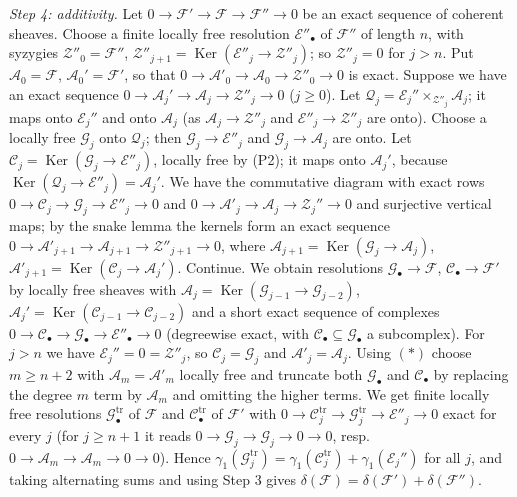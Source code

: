 \documentclass[11pt]{article}
\begin{document}
\emph{Step 4: additivity.} Let $0\to\mathcal F'\to\mathcal F\to\mathcal F''\to0$ be an exact sequence of coherent sheaves. Choose a finite locally free resolution $\mathcal E''_\bullet$ of $\mathcal F''$ of length $n$, with syzygies $\mathcal Z''_0=\mathcal F''$, $\mathcal Z''_{j+1}=\operatorname{Ker}(\mathcal E''_j\to\mathcal Z''_j)$; so $\mathcal Z''_{j}=0$ for $j>n$. Put $\mathcal A_0=\mathcal F$, $\mathcal A_0'=\mathcal F'$, so that $0\to\mathcal A'_0\to\mathcal A_0\to\mathcal Z''_0\to0$ is exact. Suppose we have an exact sequence $0\to\mathcal A_j'\to\mathcal A_j\to\mathcal Z''_j\to0$ ($j\ge0$). Let $\mathcal Q_j=\mathcal E_j''\times_{\mathcal Z''_j}\mathcal A_j$; it maps onto $\mathcal E_j''$ and onto $\mathcal A_j$ (as $\mathcal A_j\to\mathcal Z''_j$ and $\mathcal E''_j\to\mathcal Z''_j$ are onto). Choose a locally free $\mathcal G_j$ onto $\mathcal Q_j$; then $\mathcal G_j\to\mathcal E''_j$ and $\mathcal G_j\to\mathcal A_j$ are onto. Let $\mathcal C_j=\operatorname{Ker}(\mathcal G_j\to\mathcal E''_j)$, locally free by (P2); it maps onto $\mathcal A_j'$, because $\operatorname{Ker}(\mathcal Q_j\to\mathcal E''_j)=\mathcal A_j'$. We have the commutative diagram with exact rows $0\to\mathcal C_j\to\mathcal G_j\to\mathcal E''_j\to0$ and $0\to\mathcal A'_j\to\mathcal A_j\to\mathcal Z_j''\to0$ and surjective vertical maps; by the snake lemma the kernels form an exact sequence $0\to\mathcal A'_{j+1}\to\mathcal A_{j+1}\to\mathcal Z''_{j+1}\to0$, where $\mathcal A_{j+1}=\operatorname{Ker}(\mathcal G_j\to\mathcal A_j)$, $\mathcal A'_{j+1}=\operatorname{Ker}(\mathcal C_j\to\mathcal A_j')$. Continue. We obtain resolutions $\mathcal G_\bullet\to\mathcal F$, $\mathcal C_\bullet\to\mathcal F'$ by locally free sheaves with $\mathcal A_j=\operatorname{Ker}(\mathcal G_{j-1}\to\mathcal G_{j-2})$, $\mathcal A_j'=\operatorname{Ker}(\mathcal C_{j-1}\to\mathcal C_{j-2})$ and a short exact sequence of complexes $0\to\mathcal C_\bullet\to\mathcal G_\bullet\to\mathcal E''_\bullet\to0$ (degreewise exact, with $\mathcal C_\bullet\subseteq\mathcal G_\bullet$ a subcomplex). For $j>n$ we have $\mathcal E_j''=0=\mathcal Z''_j$, so $\mathcal C_j=\mathcal G_j$ and $\mathcal A'_j=\mathcal A_j$. Using $(\ast)$ choose $m\ge n+2$ with $\mathcal A_m=\mathcal A'_m$ locally free and truncate both $\mathcal G_\bullet$ and $\mathcal C_\bullet$ by replacing the degree $m$ term by $\mathcal A_m$ and omitting the higher terms. We get finite locally free resolutions $\mathcal G^{\mathrm{tr}}_\bullet$ of $\mathcal F$ and $\mathcal C^{\mathrm{tr}}_\bullet$ of $\mathcal F'$ with $0\to\mathcal C^{\mathrm{tr}}_j\to\mathcal G^{\mathrm{tr}}_j\to\mathcal E''_j\to0$ exact for every $j$ (for $j\ge n+1$ it reads $0\to\mathcal G_j\to\mathcal G_j\to0\to0$, resp.\ $0\to\mathcal A_m\to\mathcal A_m\to0\to0$). Hence $\gamma_1(\mathcal G^{\mathrm{tr}}_j)=\gamma_1(\mathcal C^{\mathrm{tr}}_j)+\gamma_1(\mathcal E_j'')$ for all $j$, and taking alternating sums and using Step 3 gives $\delta(\mathcal F)=\delta(\mathcal F')+\delta(\mathcal F'')$.
\end{document}
